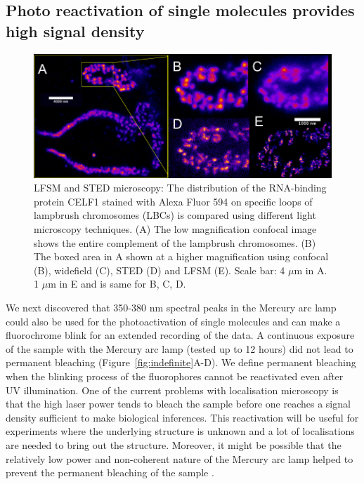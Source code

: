 \documentclass[9pt,twocolumn,twoside]{pnas-new}
\begin{document}
\subsection*{Photo reactivation of single molecules provides high signal density}

\begin{figure}[h!]
\begin{center}
\includegraphics[width=\linewidth]{Figures/Fig6.png}
\end{center}
\caption[]{LFSM and STED microscopy: The distribution of the RNA-binding protein CELF1 stained with Alexa Fluor 594 on specific loops of lampbrush chromosomes (LBCs) is compared using different light microscopy techniques. (A) The low magnification confocal image shows the entire complement of the lampbrush chromosomes. (B) The boxed area in A shown at a higher magnification using confocal (B), widefield (C), STED (D) and LFSM (E). Scale bar: 4 $\mu$m in A. 1 $\mu$m in E and is same for B, C, D. } \label{fig:lbcs}
\end{figure}

We next discovered that 350-380 nm spectral peaks in the Mercury arc lamp could also be used for the photoactivation of single molecules and can make a fluorochrome blink for an extended recording of the data. A continuous exposure of the sample with the Mercury arc lamp (tested up to 12 hours) did not lead to permanent bleaching (Figure~\ref{fig:indefinite}A-D). We define permanent bleaching when the blinking process of the fluorophores cannot be reactivated even after UV illumination. One of the current problems with localisation microscopy is that the high laser power tends to bleach the sample before one reaches a signal density sufficient to make biological inferences. This reactivation will be useful for experiments where the underlying structure is unknown and a lot of localisations are needed to bring out the structure. Moreover, it might be possible that the relatively low power and non-coherent nature of the Mercury arc lamp helped to prevent the permanent bleaching of the sample \citep{diekmann2020optimizing}.
\end{document}
